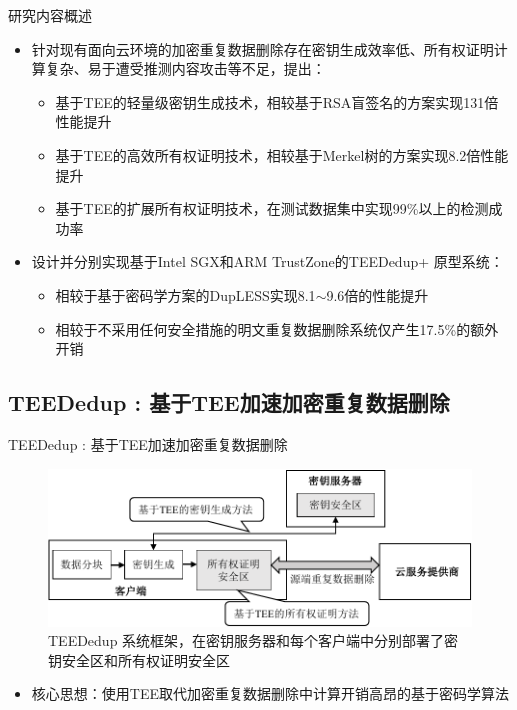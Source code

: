 \documentclass{beamer}
\newcommand{\sysnameS}{TEEDedup }
\newcommand{\prototype}{TEEDedup+ }
\begin{document}
\begin{frame}{研究内容概述}
    \begin{itemize}
        \item 针对现有面向云环境的加密重复数据删除存在密钥生成效率低、所有权证明计算复杂、易于遭受推测内容攻击等不足，提出：
              \begin{itemize}
                  \item 基于TEE的轻量级密钥生成技术，相较基于RSA盲签名的方案实现{\color{red}131倍}性能提升
                  \item 基于TEE的高效所有权证明技术，相较基于Merkel树的方案实现{\color{red}8.2倍}性能提升
                  \item 基于TEE的扩展所有权证明技术，在测试数据集中实现{\color{red}99\%}以上的检测成功率
              \end{itemize}
    \end{itemize}
    \begin{itemize}
        \item 设计并分别实现基于Intel SGX和ARM TrustZone的\prototype 原型系统：
              \begin{itemize}
                  \item 相较于基于密码学方案的DupLESS实现{\color{red}8.1$\sim$9.6倍}的性能提升
                  \item 相较于不采用任何安全措施的明文重复数据删除系统仅产生{\color{red}17.5\%}的额外开销
              \end{itemize}
    \end{itemize}
\end{frame}

\subsection{\sysnameS: 基于TEE加速加密重复数据删除}

\begin{frame}{\sysnameS: 基于TEE加速加密重复数据删除}
    \begin{figure}[!htb]
        \centering
        \includegraphics[width=\linewidth]{../pic/sgxdedup/sgxdedup-arch.pdf}
        \caption{\sysnameS 系统框架，在密钥服务器和每个客户端中分别部署了密钥安全区和所有权证明安全区}
        \label{fig:sgxdedup-overview}
    \end{figure}
    \vspace{-1em}
    \begin{itemize}
        \item  核心思想：使用TEE取代加密重复数据删除中计算开销高昂的基于密码学算法
    \end{itemize}
\end{frame}
\end{document}
